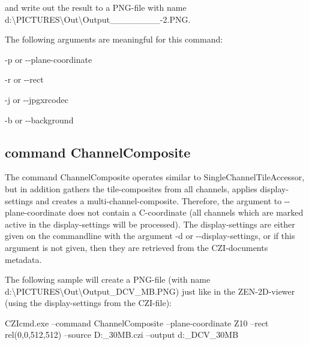 and write out the result to a P\+N\+G-\/file with name {\ttfamily d\+:\textbackslash{}P\+I\+C\+T\+U\+R\+ES\textbackslash{}Out\textbackslash{}Output\+\_\+\_\+\_\+\_\+\+\_\+\_\+\_\+\+\_-\/2.\+P\+NG}.

The following arguments are meaningful for this command\+:
\begin{DoxyItemize}
\item \textquotesingle{}-\/p\textquotesingle{} or \textquotesingle{}-\/-\/plane-\/coordinate\textquotesingle{}
\item \textquotesingle{}-\/r\textquotesingle{} or \textquotesingle{}-\/-\/rect\textquotesingle{}
\item \textquotesingle{}-\/j\textquotesingle{} or \textquotesingle{}-\/-\/jpgxrcodec\textquotesingle{}
\item \textquotesingle{}-\/b\textquotesingle{} or \textquotesingle{}-\/-\/background\textquotesingle{}
\end{DoxyItemize}

\subsection*{command \textquotesingle{}Channel\+Composite\textquotesingle{}}

The command \textquotesingle{}Channel\+Composite\textquotesingle{} operates similar to \textquotesingle{}Single\+Channel\+Tile\+Accessor\textquotesingle{}, but in addition gathers the tile-\/composites from all channels, applies display-\/settings and creates a multi-\/channel-\/composite. Therefore, the argument to \textquotesingle{}-\/-\/plane-\/coordinate\textquotesingle{} does not contain a C-\/coordinate (all channels which are marked \textquotesingle{}active\textquotesingle{} in the display-\/settings will be processed). The display-\/settings are either given on the commandline with the argument \textquotesingle{}-\/d\textquotesingle{} or \textquotesingle{}-\/-\/display-\/settings\textquotesingle{}, or if this argument is not given, then they are retrieved from the C\+Z\+I-\/document\textquotesingle{}s metadata.

The following sample will create a P\+N\+G-\/file (with name {\ttfamily d\+:\textbackslash{}P\+I\+C\+T\+U\+R\+ES\textbackslash{}Out\textbackslash{}Output\+\_\+\+D\+C\+V\+\_\+M\+B.\+P\+NG}) just like in the Z\+E\+N-\/2\+D-\/viewer (using the display-\/settings from the C\+Z\+I-\/file)\+: \begin{DoxyVerb}CZIcmd.exe --command ChannelComposite --plane-coordinate Z10 --rect rel(0,0,512,512)  --source D:\PICTURES\DCV_30MB.czi --output d:\PICTURES\Out\Output_DCV_30MB
\end{DoxyVerb}



